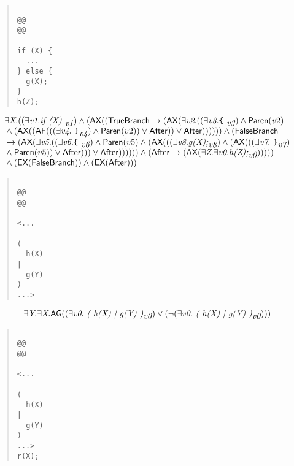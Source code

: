 \documentclass{article}
\newcommand{\AX}{\mbox{\sf{AX}}}
\newcommand{\EX}{\mbox{\sf{EX}}}
\newcommand{\AF}{\mbox{\sf{AF}}}
\newcommand{\AG}{\mbox{\sf{AG}}}
\newcommand{\mita}[1]{\mbox{\it{{#1}}}}
\newcommand{\msf}[1]{\mbox{\sf{{#1}}}}
\newcommand{\ttlb}{\mbox{\tt \char'173}}
\newcommand{\ttrb}{\mbox{\tt \char'175}}
\begin{document}
\begin{quote}\begin{verbatim}

@@
@@

if (X) {
  ...
} else {
  g(X);
}
h(Z);
\end{verbatim}\end{quote}

\[\begin{array}{l}
\exists \mita{X} . ((\exists \mita{v1} . \mita{if (X) }_{\mita{v1}}) \wedge (\AX((\msf{TrueBranch} \rightarrow (\AX(\exists \mita{v2} . ((\exists \mita{v3} . \mita{{\ttlb}
  }_{\mita{v3}}) \wedge \msf{Paren}(v2)\\\mbox{} \wedge (\AX((\AF(((\exists \mita{v4} . \mita{
{\ttrb}}_{\mita{v4}}) \wedge \msf{Paren}(v2)) \vee \msf{After})) \vee \msf{After})))))) \wedge (\msf{FalseBranch}\\\mbox{} \rightarrow (\AX(\exists \mita{v5} . ((\exists \mita{v6} . \mita{{\ttlb}
  }_{\mita{v6}}) \wedge \msf{Paren}(v5) \wedge (\AX(((\exists \mita{v8} . \mita{g(X);}_{\mita{v8}}) \wedge (\AX(((\exists \mita{v7} . \mita{
{\ttrb}}_{\mita{v7}})\\\mbox{} \wedge \msf{Paren}(v5)) \vee \msf{After}))) \vee \msf{After})))))) \wedge (\msf{After} \rightarrow (\AX(\exists \mita{Z} . \exists \mita{v0} . \mita{h(Z);}_{\mita{v0}})))))\\\mbox{} \wedge (\EX(\msf{FalseBranch})) \wedge (\EX(\msf{After})))
\end{array}\]

\begin{quote}\begin{verbatim}

@@
@@

<...
  
(
  h(X)
|
  g(Y)
)
...>
\end{verbatim}\end{quote}

\[\begin{array}{l}
\exists \mita{Y} . \exists \mita{X} . \AG((\exists \mita{v0} . \mita{
(
h(X)
|
g(Y)
)}_{\mita{v0}}) \vee (\neg (\exists \mita{v0} . \mita{
(
h(X)
|
g(Y)
)}_{\mita{v0}})))
\end{array}\]

\begin{quote}\begin{verbatim}

@@
@@

<...
  
(
  h(X)
|
  g(Y)
)
...>
r(X);
\end{verbatim}\end{quote}
\end{document}
